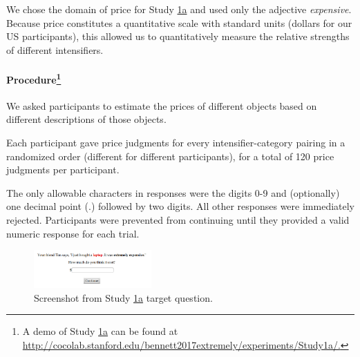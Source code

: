\documentclass[10pt,letterpaper]{article}
\newcommand{\w}[1]{\emph{#1}}
\begin{document}
We chose the domain of price for Study \hyperref[sec:study1a]{1a} and used only the adjective \w{expensive}.
Because price constitutes a quantitative scale with standard units (dollars for our US participants), this allowed us to quantitatively measure the relative strengths of different intensifiers.

\paragraph{Procedure\footnote{A demo of Study \hyperref[sec:study1a]{1a} can be found at \url{http://cocolab.stanford.edu/bennett2017extremely/experiments/Study1a/.}}}

We asked participants to estimate the prices of different objects based on different descriptions of those objects. 

Each participant gave price judgments for every intensifier-category pairing in a randomized order (different for different participants), for a total of 120 price judgments per participant.  

The only allowable characters in responses were the digits 0-9 and (optionally) one decimal point (.) followed by two digits. All other responses were immediately rejected.
Participants were prevented from continuing until they provided a valid numeric response for each trial.

\begin{figure}[ht]
\begin{center}
\includegraphics[width=0.4\textwidth]{exp1-q.png}
\end{center}
\caption{Screenshot from Study \hyperref[sec:study1a]{1a} target question.} 
\label{fig:question_study1a}
\end{figure}
\end{document}
